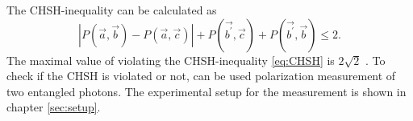 The CHSH-inequality can be calculated \cite{barz} as
\begin{equation}
\left| P\left(\vec{a},\vec{b}\right)-P\left(\vec{a},\vec{c}\right)\right| + P\left(\vec{b^{\prime}},\vec{c}\right)+ P\left(\vec{b^{\prime}},\vec{b}\right) \leq 2.
\label{eq:CHSH}
\end{equation}
The maximal value of violating the CHSH-inequality \eqref{eq:CHSH} is $2\sqrt{2}$ \cite{barz}.
To check  if the CHSH is violated or not, can be used polarization measurement of two entangled photons. 
The experimental setup for the measurement is shown in chapter \ref{sec:setup}. 








